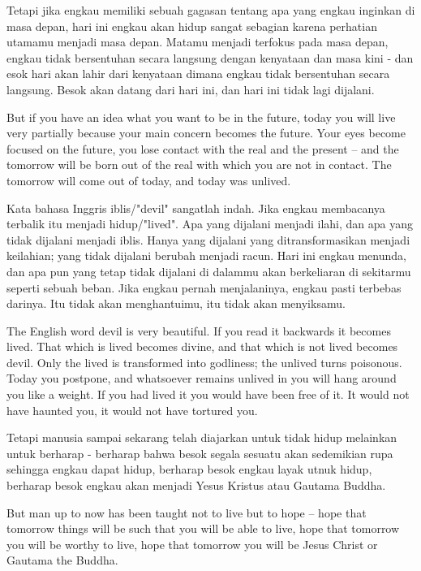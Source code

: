 \bahasa
Tetapi jika engkau memiliki sebuah gagasan tentang apa yang engkau inginkan di masa depan, hari ini engkau akan hidup sangat sebagian karena perhatian utamamu menjadi masa depan. Matamu menjadi terfokus pada masa depan, engkau tidak bersentuhan secara langsung dengan kenyataan dan masa kini - dan esok hari akan lahir dari kenyataan dimana engkau tidak bersentuhan secara langsung. Besok akan datang dari hari ini, dan hari ini tidak lagi dijalani.

\english
But if you have an idea what you want to be in the future, today you will live very partially because your main concern becomes the future. Your eyes become focused on the future, you lose contact with the real and the present -- and the tomorrow will be born out of the real with which you are not in contact. The tomorrow will come out of today, and today was unlived.

\bahasa
Kata bahasa Inggris iblis/"devil" sangatlah indah. Jika engkau membacanya terbalik itu menjadi hidup/"lived". Apa yang dijalani menjadi ilahi, dan apa yang tidak dijalani menjadi iblis. Hanya yang dijalani yang ditransformasikan menjadi keilahian; yang tidak dijalani berubah menjadi racun. Hari ini engkau menunda, dan apa pun yang tetap tidak dijalani di dalammu akan berkeliaran di sekitarmu seperti sebuah beban. Jika engkau pernah menjalaninya, engkau pasti terbebas darinya. Itu tidak akan menghantuimu, itu tidak akan menyiksamu.

\english
The English word devil is very beautiful. If you read it backwards it becomes lived. That which is lived becomes divine, and that which is not lived becomes devil. Only the lived is transformed into godliness; the unlived turns poisonous. Today you postpone, and whatsoever remains unlived in you will hang around you like a weight. If you had lived it you would have been free of it. It would not have haunted you, it would not have tortured  you.

\bahasa
Tetapi manusia sampai sekarang telah diajarkan untuk tidak hidup melainkan untuk berharap - berharap bahwa besok segala sesuatu akan sedemikian rupa sehingga engkau dapat hidup, berharap besok engkau layak utnuk hidup, berharap besok engkau akan menjadi Yesus Kristus atau Gautama Buddha.

\english
But man up to now has been taught not to live but to hope -- hope that tomorrow things will be such that you will be able to live, hope that tomorrow you will be worthy to live, hope that tomorrow you will be Jesus Christ or Gautama the Buddha.

